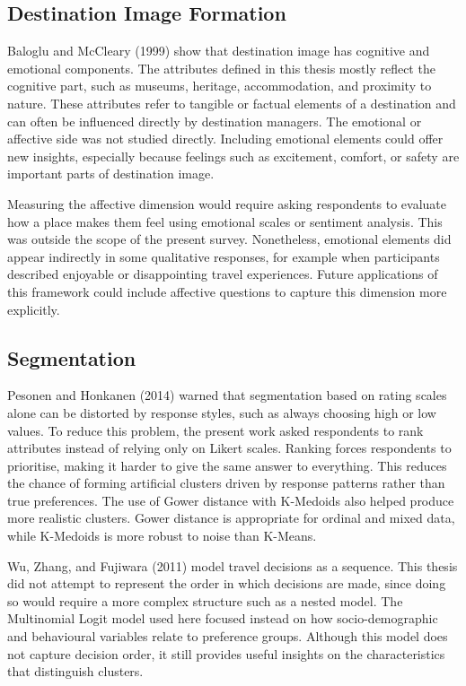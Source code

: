 \documentclass[a4paper, 12pt, twoside]{report}  %
\begin{document}
\subsection{Destination Image Formation}

\indent Baloglu and McCleary (1999) show that destination image has cognitive and emotional components. The attributes defined in this thesis mostly reflect the cognitive part, such as museums, heritage, accommodation, and proximity to nature. These attributes refer to tangible or factual elements of a destination and can often be influenced directly by destination managers. The emotional or affective side was not studied directly. Including emotional elements could offer new insights, especially because feelings such as excitement, comfort, or safety are important parts of destination image.

\indent Measuring the affective dimension would require asking respondents to evaluate how a place makes them feel using emotional scales or sentiment analysis. This was outside the scope of the present survey. Nonetheless, emotional elements did appear indirectly in some qualitative responses, for example when participants described enjoyable or disappointing travel experiences. Future applications of this framework could include affective questions to capture this dimension more explicitly.

\subsection{Segmentation}

\indent Pesonen and Honkanen (2014) warned that segmentation based on rating scales alone can be distorted by response styles, such as always choosing high or low values. To reduce this problem, the present work asked respondents to rank attributes instead of relying only on Likert scales. Ranking forces respondents to prioritise, making it harder to give the same answer to everything. This reduces the chance of forming artificial clusters driven by response patterns rather than true preferences. The use of Gower distance with K-Medoids also helped produce more realistic clusters. Gower distance is appropriate for ordinal and mixed data, while K-Medoids is more robust to noise than K-Means. 

\indent Wu, Zhang, and Fujiwara (2011) model travel decisions as a sequence. This thesis did not attempt to represent the order in which decisions are made, since doing so would require a more complex structure such as a nested model. The Multinomial Logit model used here focused instead on how socio-demographic and behavioural variables relate to preference groups. Although this model does not capture decision order, it still provides useful insights on the characteristics that distinguish clusters.
\end{document}
